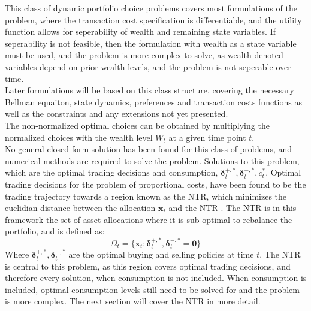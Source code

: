 \documentclass[11pt]{article}
\begin{document}
This class of dynamic portfolio choice problems covers most formulations of the problem,
where the transaction cost specification is differentiable, and the utility function allows for seperability of wealth and remaining state variables.
If seperability is not feasible, then the formulation with wealth as a state variable must be used, and the problem is more complex to solve,
as wealth denoted variables depend on prior wealth levels, and the problem is not seperable over time.\\
Later formulations will be based on this class structure, covering the necessary Bellman equaiton, state dynamics, preferences and transaction costs functions as well as the constraints
and any extensions not yet presented.\\
The non-normalized optimal choices can be obtained by multiplying the normalized choices with the wealth level $W_t$ at a given time point $t$.\\
No general closed form solution has been found for this class of problems, and numerical methods are required to solve the problem.
Solutions to this problem, which are the optimal trading decisions and consumption, $\boldsymbol{\delta}^{+,*}_t , \boldsymbol{\delta}^{-,*}_t, c^{*}_{t}$.
Optimal trading decisions for the problem of proportional costs, have been found to be the trading trajectory towards a region known as the \ac{NTR},
which minimizes the euclidian distance between the allocation $\mathbf{x}_{t}$ and the \ac{NTR} \autocite{CaiJuddXu2013}.
The \ac{NTR} is in this framework the set of asset allocations where it is sub-optimal to rebalance the portfolio, and is defined as:
\begin{equation}
  \label{eq:No_Trade_Region}
  \Omega_t = \{ \mathbf{x}_{t} : \boldsymbol{\delta}^{+,*}_t , \boldsymbol{\delta}^{-,*}_t = \mathbf{0} \}
\end{equation}
Where $\boldsymbol{\delta}^{+,*}_t , \boldsymbol{\delta}^{-,*}_t$ are the optimal buying and selling policies at time $t$.
The NTR is central to this problem, as this region covers optimal trading decisions, and therefore every solution, when consumption is not included.
When consumption is included, optimal consumption levels still need to be solved for and the problem is more complex.
The next section will cover the \ac{NTR} in more detail.
\end{document}
